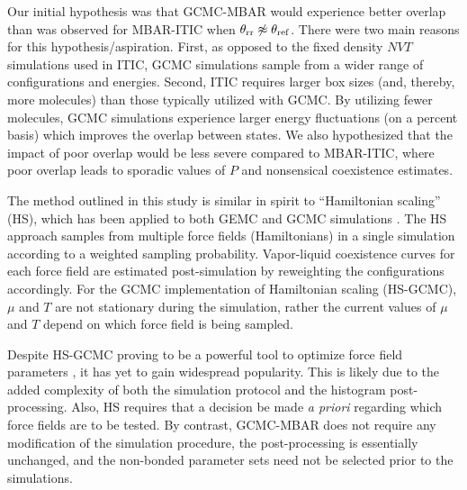 \documentclass[journal=jced,manuscript=article]{achemso}
\begin{document}

Our initial hypothesis was that GCMC-MBAR would experience better overlap than was observed for MBAR-ITIC when $\theta_{\rm rr} \not\approx \theta_{\rm ref}$. There were two main reasons for this hypothesis/aspiration. First, as opposed to the fixed density $NVT$ simulations used in ITIC, GCMC simulations sample from a wider range of configurations and energies. Second, ITIC requires larger box sizes (and, thereby, more molecules) than those typically utilized with GCMC. By utilizing fewer molecules, GCMC simulations experience larger energy fluctuations (on a percent basis) which improves the overlap between states. We also hypothesized that the impact of poor overlap would be less severe compared to MBAR-ITIC, where poor overlap leads to sporadic values of $P$ and nonsensical coexistence estimates.  



The method outlined in this study is similar in spirit to ``Hamiltonian scaling'' (HS), which has been applied to both GEMC \cite{Kiyohara1996} and GCMC simulations \cite{Errington1998,Exp6,Errington1999,Pana2000}. The HS approach samples from multiple force fields (Hamiltonians) in a single simulation according to a weighted sampling probability. Vapor-liquid coexistence curves for each force field are estimated post-simulation by reweighting the configurations accordingly. For the GCMC implementation of Hamiltonian scaling (HS-GCMC), $\mu$ and $T$ are not stationary during the simulation, rather the current values of $\mu$ and $T$ depend on which force field is being sampled. 

Despite HS-GCMC proving to be a powerful tool to optimize force field parameters \cite{Errington1998,Exp6,Errington1999,Pana2000}, it has yet to gain widespread popularity. This is likely due to the added complexity of both the simulation protocol and the histogram post-processing. Also, HS requires that a decision be made \textit{a priori} regarding which force fields are to be tested. By contrast, GCMC-MBAR does not require any modification of the simulation procedure, the post-processing is essentially unchanged, and the non-bonded parameter sets need not be selected prior to the simulations.
\end{document}
